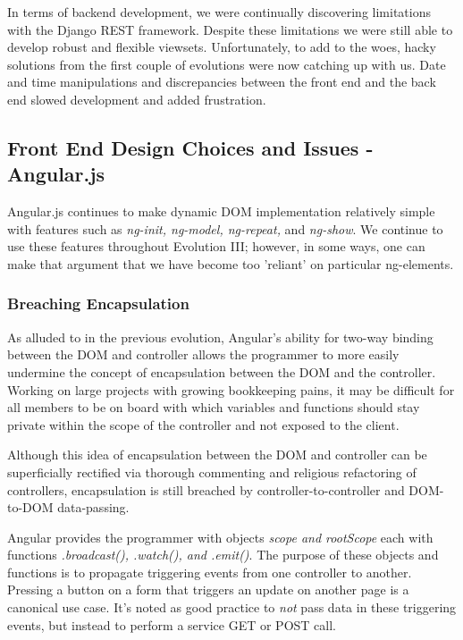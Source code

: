\documentclass[a4paper]{article}
\begin{document}
In terms of backend development, we were continually discovering limitations with the Django REST framework. Despite these limitations we were still able to develop robust and flexible viewsets. Unfortunately, to add to the woes, hacky solutions from the first couple of evolutions were now catching up with us. Date and time manipulations and discrepancies between the front end and the back end slowed development and added frustration.

\subsection{Front End Design Choices and Issues - Angular.js}

Angular.js continues to make dynamic DOM implementation relatively simple with features such as \textit{ng-init, ng-model, ng-repeat,} and \textit{ng-show}. We continue to use these features throughout Evolution III; however, in some ways, one can make that argument that we have become too 'reliant' on particular ng-elements. 


\subsubsection{Breaching Encapsulation}

As alluded to in the previous evolution, Angular's ability for two-way binding between the DOM and controller allows the programmer to more easily undermine the concept of encapsulation between the DOM and the controller. Working on large projects with growing bookkeeping pains, it may be difficult for all members to be on board with which variables and functions should stay private within the scope of the controller and not exposed to the client.

Although this idea of encapsulation between the DOM and controller can be superficially rectified via thorough commenting and religious refactoring of controllers, encapsulation is still breached by controller-to-controller and DOM-to-DOM data-passing.

Angular provides the programmer with objects \textit{scope and rootScope} each with functions \textit{.broadcast(), .watch(), and .emit()}. The purpose of these objects and functions is to propagate triggering events from one controller to another. Pressing a button on a form that triggers an update on another page is a canonical use case. It's noted as good practice to \textit{not} pass data in these triggering events, but instead to perform a service GET or POST call.
\end{document}
